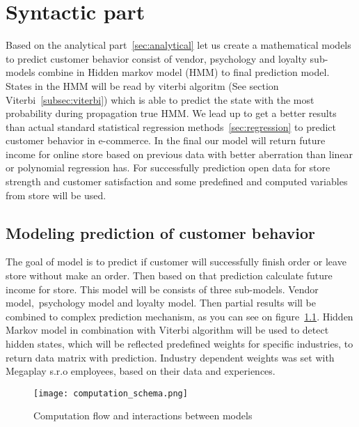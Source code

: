
\chapter{Syntactic part} \label{sec:methodology}
Based on the analytical part~\ref{sec:analytical} let us create a mathematical models to predict customer behavior consist of
vendor, psychology and loyalty sub-models combine in Hidden markov model (HMM) to final prediction model.
States in the HMM will be read by viterbi algoritm (See section Viterbi~\ref{subsec:viterbi}) which is able to predict the state with the most probability during propagation true HMM.
We lead up to get a better results than actual standard statistical regression methods~\ref{sec:regression} to predict customer behavior in e-commerce.
In the final our model will return future income for online store based on previous data with better aberration than linear or polynomial regression has.
For successfully prediction open data for store strength and customer satisfaction and some predefined and computed variables from store will be used.
\section{Modeling prediction of customer behavior} \label{sec:modeling}
The goal of model is to predict if customer will successfully finish order or leave store without make an order.
Then based on that prediction calculate future income for store.
This model will be consists of three sub-models.
Vendor model,\ psychology model and loyalty model.
Then partial results will be combined to complex prediction mechanism, as you can see on figure~\ref{Model schema with interaction}.
Hidden Markov model in combination with Viterbi algorithm will be used to detect hidden states, which will be reflected predefined weights for specific industries,
to return data matrix with prediction.
Industry dependent weights was set with Megaplay s.r.o employees, based on their data and experiences.
\\
\begin{figure}[h!]
    \begin{center}
        \texttt{[image: computation\_schema.png]}
    \end{center}
    \caption{Computation flow and interactions between models}
    \label{Model schema with interaction}
\end{figure}
\\
